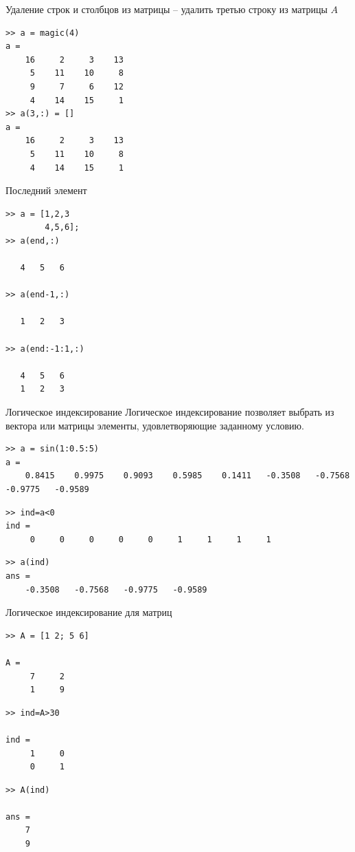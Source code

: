 \documentclass[11pt, compress]{beamer}
\begin{document}
\begin{frame}[fragile]{Удаление строк и столбцов из матрицы}
 -- удалить третью строку из матрицы $A$
\begin{lstlisting}
>> a = magic(4)
a =
    16     2     3    13
     5    11    10     8
     9     7     6    12
     4    14    15     1
>> a(3,:) = []
a =
    16     2     3    13
     5    11    10     8
     4    14    15     1
\end{lstlisting}
\end{frame}

\begin{frame}[fragile]{Последний элемент}
\begin{lstlisting}
>> a = [1,2,3 
        4,5,6];
>> a(end,:)
    
   4   5   6 

>> a(end-1,:)
    
   1   2   3 

>> a(end:-1:1,:)   

   4   5   6
   1   2   3 
\end{lstlisting}
\end{frame}  


\begin{frame}[fragile]{Логическое индексирование}
Логическое индексирование позволяет выбрать из вектора или матрицы элементы, удовлетворяющие заданному условию.
\begin{lstlisting}
>> a = sin(1:0.5:5)
a =
    0.8415    0.9975    0.9093    0.5985    0.1411   -0.3508   -0.7568   -0.9775   -0.9589
\end{lstlisting}
\begin{lstlisting}
>> ind=a<0
ind =
     0     0     0     0     0     1     1     1     1
\end{lstlisting}
\begin{lstlisting}
>> a(ind)   
ans = 
    -0.3508   -0.7568   -0.9775   -0.9589
\end{lstlisting}
\end{frame}

\begin{frame}[fragile]{Логическое индексирование для матриц}
\begin{lstlisting}
>> A = [1 2; 5 6]

A =
     7     2
     1     9
\end{lstlisting}
\begin{lstlisting}
>> ind=A>30

ind =
     1     0
     0     1
\end{lstlisting}
\begin{lstlisting}
>> A(ind)   

ans = 
    7
    9
\end{lstlisting}
\end{frame}
\end{document}

